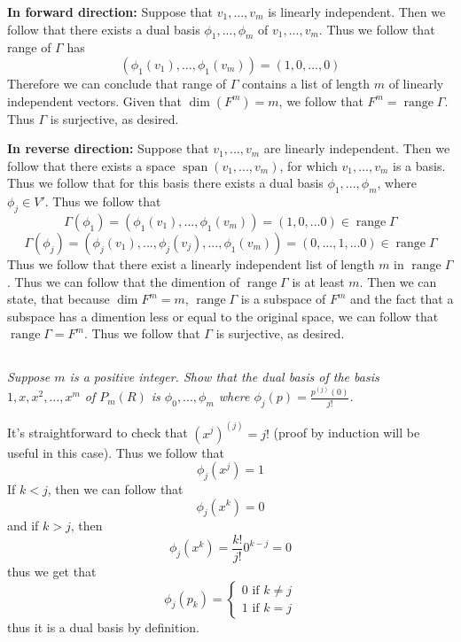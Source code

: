 \documentclass[11pt,oneside,titlepage]{book}
\DeclareMathOperator \range {range}
\DeclareMathOperator \Span {span}
\begin{document}
\textbf{In forward direction: }
Suppose that $v_1, ..., v_m$ is linearly independent. Then  we follow that there exists
a dual basis $\phi_1, ..., \phi_m$ of $v_1, ..., v_m$. Thus we follow that range of $\Gamma$
has
$$(\phi_1(v_1), ..., \phi_1(v_m)) = (1, 0, ..., 0)$$
Therefore we can conclude that range of $\Gamma$ contains a list of length  $m$  of linearly
independent vectors. Given that $\dim (F^m) = m$, we follow that $F^m = \range \Gamma$. Thus
$\Gamma$ is surjective, as desired.

\textbf{In reverse direction: }
Suppose that $v_1, ..., v_m$ are linearly independent. Then we follow
that there exists a space $\Span(v_1, ..., v_m)$, for which $v_1, ..., v_m$ is a basis.
Thus we follow that for this basis there exists a dual basis $\phi_1, ..., \phi_m$,
where $\phi_j \in V'$. Thus we follow that
$$\Gamma(\phi_1) = (\phi_1(v_1), ..., \phi_1(v_m)) = (1, 0, ... 0) \in \range \Gamma$$
$$\Gamma(\phi_j) = (\phi_j(v_1), ..., \phi_j(v_j), ..., \phi_1(v_m)) = (0, ..., 1, ... 0)
\in \range \Gamma $$
Thus we follow that there exist a linearly independent list of length $m$ in $\range \Gamma$. Thus
we can follow that the dimention of $\range \Gamma$ is at least $m$. Then we can state, that
because $\dim F^m = m$, $\range \Gamma$ is a subspace of $F^m$ and the fact that
a subspace has a dimention less or equal to the original space, we can follow that
$\range \Gamma = F^m$. Thus we follow that $\Gamma$ is surjective, as desired.

\subsection{}

\textit{Suppose $m$ is a positive integer. Show that the dual basis of the basis
  $1, x, x^2, ..., x^m$ of $P_m(R)$ is $\phi_0, ..., \phi_m$ where
  $\phi_j(p) = \frac{p^{(j)}(0)}{j!}$.}

It's straightforward to check that $(x^j)^{(j)} =  j!$ (proof by induction will be useful in this
case). Thus we follow that
$$\phi_j(x^j) = 1$$
If $k < j$, then we can follow that
$$\phi_j(x^k) = 0$$
and if $k > j$, then 
$$\phi_j(x^k) = \frac{k!}{j!}0^{k - j} = 0$$
thus we get that
$$\phi_j(p_k) =
\begin{cases}
  0 \text{ if } k \neq j \\
  1 \text{ if } k = j 
\end{cases}
$$
thus it is a dual basis by definition.

\subsection{}
\end{document}
